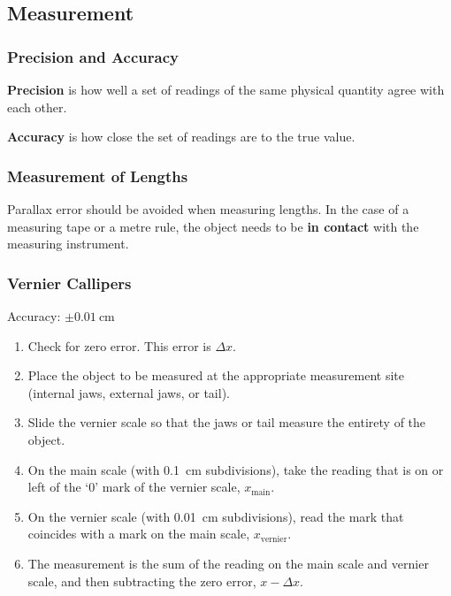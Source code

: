 \documentclass[../main.tex]{subfiles}
\begin{document}
		\subsection{Measurement}
		\subsubsection{Precision and Accuracy}
		
		\textbf{Precision} is how well a set of readings of the same physical quantity agree with each other.
		
		\textbf{Accuracy} is how close the set of readings are to the true value.
		
		\subsubsection{Measurement of Lengths}
		Parallax error should be avoided when measuring lengths. In the case of a measuring tape or a metre rule, the object needs to be \textbf{in contact} with the measuring instrument.
		
		\subsubsection*{Vernier Callipers}
		Accuracy: \(\pm \SI{0.01}{\centi\meter}\)
		\begin{enumerate}
			\item Check for zero error. This error is \(\Delta x\).
			\item Place the object to be measured at the appropriate measurement site (internal jaws, external jaws, or tail).
			\item Slide the vernier scale so that the jaws or tail measure the entirety of the object.
			\item On the main scale (with \SI{0.1}{\centi\meter} subdivisions), take the reading that is on or left of the `0' mark of the vernier scale, \(x_\mathrm{main}\).
			\item On the vernier scale (with \SI{0.01}{\centi\meter} subdivisions), read the mark that coincides with a mark on the main scale, \(x_\mathrm{vernier}\).
			\item The measurement is the sum of the reading on the main scale and vernier scale, and then subtracting the zero error, \(x-\Delta x\).
		\end{enumerate}
	
\end{document}
